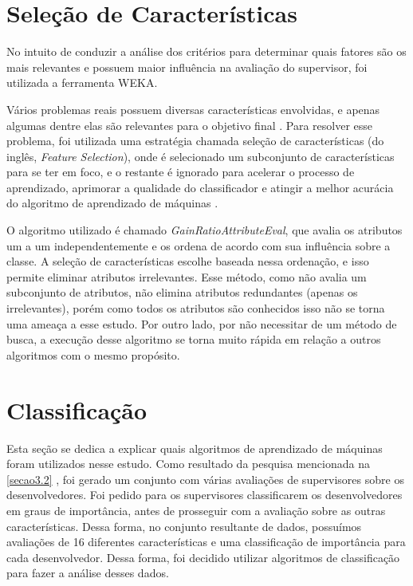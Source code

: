 \section{Seleção de Características}\label{secao3.3}

No intuito de conduzir a análise dos critérios para determinar quais fatores são os mais relevantes e possuem maior influência na avaliação do supervisor, foi utilizada a ferramenta WEKA.

Vários problemas reais possuem diversas características envolvidas, e apenas algumas dentre elas são relevantes para o objetivo final \cite{Kira1992}. Para resolver esse problema, foi utilizada uma estratégia chamada seleção de características (do inglês, \textit{Feature Selection}), onde é selecionado um subconjunto de características para se ter em foco, e o restante é ignorado para acelerar o processo de aprendizado, aprimorar a qualidade do classificador e atingir a melhor acurácia do algoritmo de aprendizado de máquinas \cite{Kira1992,Kohavi1997}. 

O algoritmo utilizado é chamado \textit{GainRatioAttributeEval}, que avalia os atributos um a um independentemente e os ordena de acordo com sua influência sobre a classe. A seleção de características escolhe baseada nessa ordenação, e isso permite eliminar atributos irrelevantes. Esse método, como não avalia um subconjunto de atributos, não elimina atributos redundantes (apenas os irrelevantes), porém como todos os atributos são conhecidos isso não se torna uma ameaça a esse estudo. Por outro lado, por não necessitar de um método de busca, a execução desse algoritmo se torna muito rápida em relação a outros algoritmos com o mesmo propósito.

\section{Classificação}\label{secao3.4}

Esta seção se dedica a explicar quais algoritmos de aprendizado de máquinas foram utilizados nesse estudo. Como resultado da pesquisa mencionada na \autoref{secao3.2} , foi gerado um conjunto com várias avaliações de supervisores sobre os desenvolvedores. Foi pedido para os supervisores classificarem os desenvolvedores em graus de importância, antes de prosseguir com a avaliação sobre as outras características. Dessa forma, no conjunto resultante de dados, possuímos avaliações de 16 diferentes características e uma classificação de importância para cada desenvolvedor. Dessa forma, foi decidido utilizar algoritmos de classificação para fazer a análise desses dados.


